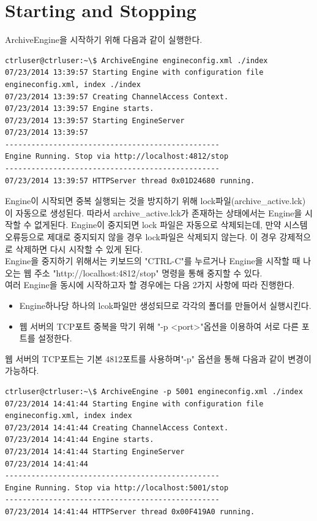 \documentclass[11pt
  , a4paper
  , article
  , oneside
]{memoir}
\begin{document}
\section{Starting and Stopping}
ArchiveEngine을 시작하기 위해 다음과 같이 실행한다.
\begin{lstlisting}[style=termstyle]
ctrluser@ctrluser:~\$ ArchiveEngine engineconfig.xml ./index
07/23/2014 13:39:57 Starting Engine with configuration file engineconfig.xml, index ./index
07/23/2014 13:39:57 Creating ChannelAccess Context.
07/23/2014 13:39:57 Engine starts.
07/23/2014 13:39:57 Starting EngineServer
07/23/2014 13:39:57 
-------------------------------------------------
Engine Running. Stop via http://localhost:4812/stop
-------------------------------------------------
07/23/2014 13:39:57 HTTPServer thread 0x01D24680 running.
\end{lstlisting}
Engine이 시작되면 중복 실행되는 것을 방지하기 위해 lock파일(archive\_active.lck)이 자동으로 생성된다.
따라서 archive\_active.lck가 존재하는 상태에서는 Engine을 시작할 수 없게된다. Engine이 중지되면 lock
파일은 자동으로 삭제되는데, 만약 시스템 오류등으로 제대로 중지되지 않을 경우 lock파일은 삭제되지 않는다.
이 경우 강제적으로 삭제하면 다시 시작할 수 있게 된다.\\
Engine을 중지하기 위해서는 키보드의 "CTRL-C"를 누르거나 Engine을 시작할 때 나오는 웹 주소
"http://localhost:4812/stop" 명령을 통해 중지할 수 있다.\\
여러 Engine을 동시에 시작하고자 할 경우에는 다음 2가지 사항에 따라 진행한다.
\begin{itemize}
\item Engine하나당 하나의 lcok파일만 생성되므로 각각의 폴더를 만들어서 실행시킨다.
\item 웹 서버의 TCP포트 중복을 막기 위해 "-p <port>"옵션을 이용하여 서로 다른 포트를 설정한다.
\end{itemize}
웹 서버의 TCP포트는 기본 4812포트를 사용하며"-p" 옵션을 통해 다음과 같이 변경이 가능하다.
\begin{lstlisting}[style=termstyle]
ctrluser@ctrluser:~\$ ArchiveEngine -p 5001 engineconfig.xml ./index
07/23/2014 14:41:44 Starting Engine with configuration file engineconfig.xml, index index
07/23/2014 14:41:44 Creating ChannelAccess Context.
07/23/2014 14:41:44 Engine starts.
07/23/2014 14:41:44 Starting EngineServer
07/23/2014 14:41:44 
-------------------------------------------------
Engine Running. Stop via http://localhost:5001/stop
-------------------------------------------------
07/23/2014 14:41:44 HTTPServer thread 0x00F419A0 running.
\end{lstlisting} 
\end{document}
